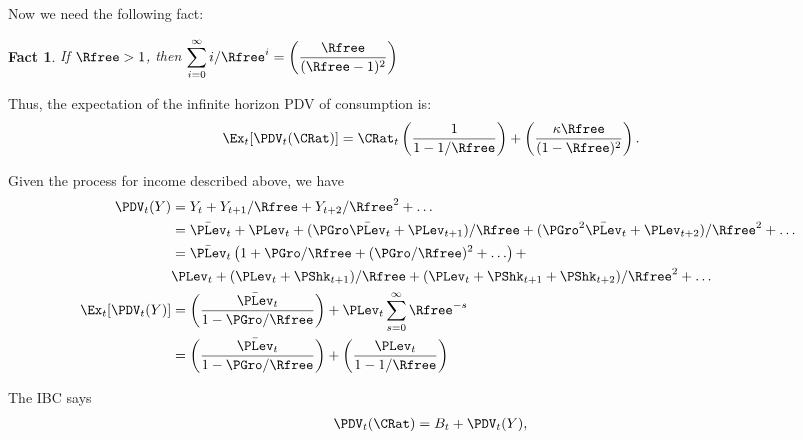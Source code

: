 \documentclass{handout}
\newtheorem{Fact}{Fact}
\begin{document}
Now we need the following fact:
\begin{Fact} If $\Rfree > 1$, then $\displaystyle \sum_{i=0}^{\infty} i/\Rfree^{i} = \left(\frac{\Rfree}{(\Rfree-1)^{2}}\right)$ \label{fact:fact3}
\end{Fact}


Thus, the expectation of the infinite horizon PDV of consumption is:
\begin{equation}\begin{gathered}\begin{aligned}
        \Ex_{t}[\PDV_{t}(\CRat)] & =  \CRat_{t}\left(\frac{1}{1-1/\Rfree}\right)+\left(\frac{\kappa \Rfree}{(1-\Rfree)^{2}}\right)  .
\end{aligned}\end{gathered}\end{equation}

Given the process for income described above, we have
\begin{equation}\begin{gathered}\begin{aligned}
        \PDV_{t}(Y) & =  Y_{t}+Y_{t+1}/\Rfree+Y_{t+2}/\Rfree^{2}+\ldots  \\
         & =  \bar{\PLev}_{t}+\PLev_{t}+(\PGro\bar{\PLev}_{t}+\PLev_{t+1})/\Rfree + (\PGro^{2}\bar{\PLev}_{t}+\PLev_{t+2})/\Rfree^{2}+ \ldots
\\   & =  \bar{\PLev}_{t}\left(1+\PGro/\Rfree + (\PGro/\Rfree)^{2} + \ldots \right)+
\\   &    \PLev_{t}+(\PLev_{t}+\PShk_{t+1})/\Rfree+(\PLev_{t}+\PShk_{t+1}+\PShk_{t+2})/\Rfree^{2}+\ldots    
\\ \Ex_{t}[\PDV_{t}(Y)]   & =  \left(\frac{\bar{\PLev}_{t}}{1-\PGro/\Rfree}\right)+\PLev_{t}\sum_{s=0}^{\infty} \Rfree^{-s}
\\   & =  \left(\frac{\bar{\PLev}_{t}}{1-\PGro/\Rfree}\right)+\left(\frac{ \PLev_{t}}{1-1/\Rfree}\right)
\end{aligned}\end{gathered}\end{equation}

The IBC says
\begin{equation}\begin{gathered}\begin{aligned}
        \PDV_{t}(\CRat) & =  B_{t}+\PDV_{t}(Y),
\end{aligned}\end{gathered}\end{equation}
\end{document}
